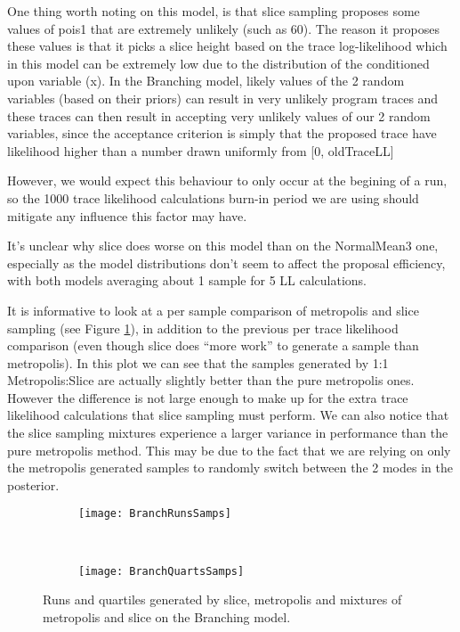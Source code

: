 One thing worth noting on this model, is that slice sampling proposes some values of pois1 that are extremely unlikely (such as 60). The reason it proposes these values is that it picks a slice height based on the trace log-likelihood which in this model can be extremely low due to the distribution of the conditioned upon variable (x). In the Branching model, likely values of the 2 random variables (based on their priors) can result in very unlikely program traces and these traces can then result in accepting very unlikely values of our 2 random variables, since the acceptance criterion is simply that the proposed trace have likelihood higher than a number drawn uniformly from [0, oldTraceLL]

However, we would expect this behaviour to only occur at the begining of a run, so the 1000 trace likelihood calculations burn-in period we are using should mitigate any influence this factor may have.

It's unclear why slice does worse on this model than on the NormalMean3 one, especially as the model distributions don't seem to affect the proposal efficiency, with both models averaging about 1 sample for 5 LL calculations. 

It is informative to look at a per sample comparison of metropolis and slice sampling (see Figure \ref{fig:branchPerfSamps}), in addition to the previous per trace likelihood comparison (even though slice does ``more work'' to generate a sample than metropolis). In this plot we can see that the samples generated by 1:1 Metropolis:Slice are actually slightly better than the pure metropolis ones. However the difference is not large enough to make up for the extra trace likelihood calculations that slice sampling must perform. We can also notice that the slice sampling mixtures experience a larger variance in performance than the pure metropolis method. This may be due to the fact that we are relying on only the metropolis generated samples to randomly switch between the 2 modes in the posterior.

\begin{figure}[h]
        \centering
        \begin{subfigure}[b]{0.48\textwidth}
                \centering
                \texttt{[image: BranchRunsSamps]}
        \end{subfigure}
        ~ 
        \begin{subfigure}[b]{0.48\textwidth}
                \centering
                \texttt{[image: BranchQuartsSamps]}
        \end{subfigure}
    \caption{Runs and quartiles generated by slice, metropolis and mixtures of metropolis and slice on the Branching model.}
    \label{fig:branchPerfSamps}
\end{figure}

